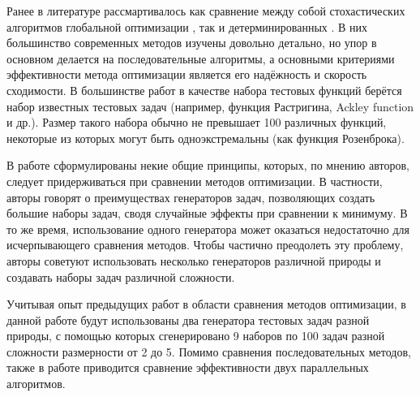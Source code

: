 \documentclass{svproc}
\begin{document}
\begin{Russian}
Ранее в литературе рассмартивалось как сравнение между собой стохастических алгоритмов глобальной оптимизации \cite{Ali2005, JSSv060i06}, так и детерминированных \cite{posik2012, KVASOV2018245, Liberti2005}.
В них большинство современных методов изучены довольно детально, но упор в основном делается на последовательные алгоритмы, а основными критериями эффективности метода оптимизации является его надёжность и скорость сходимости. В большинстве работ в качестве набора тестовых функций берётся набор известных тестовых задач (например, функция Растригина, Ackley function и др.). Размер такого набора обычно не превышает 100 различных функций, некоторые из которых могут быть одноэкстремальны (как функция Розенброка).

В работе \cite{Beiranvand2017} сформулированы некие общие принципы, которых, по мнению авторов, следует придерживаться при сравнении методов оптимизации.
В частности, авторы говорят о преимуществах генераторов задач, позволяющих создать большие наборы задач, сводя случайные эффекты при сравнении к минимуму. В то же время, использование одного генератора может оказаться недостаточно для исчерпывающего сравнения методов. Чтобы частично преодолеть эту проблему, авторы \cite{Beiranvand2017} советуют использовать несколько генераторов различной природы и создавать наборы задач различной сложности.

Учитывая опыт предыдущих работ в области сравнения методов оптимизации, в данной работе будут использованы два генератора тестовых задач разной природы, с помощью которых сгенерировано 9 наборов по 100 задач разной сложности размерности от 2 до 5. Помимо сравнения последовательных методов, также в работе приводится сравнение эффективности двух параллельных алгоритмов.
\end{Russian}
\end{document}
